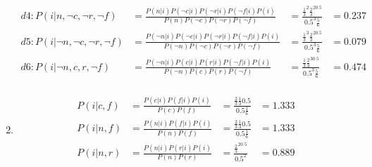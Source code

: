\documentclass{article}
\begin{document}
\begin{enumerate}
\begin{align*}
            d4: P(i|n,\lnot c,\lnot r,\lnot f) &=\frac{P(n|i)P(\lnot c|i)P(\lnot r|i)P(\lnot
        f|i)P(i)}{P(n)P(\lnot c)P(\lnot r)P(\lnot f)} &=
            \frac{\frac{1}{3}^2\frac{2}{3}^20.5}{0.5^3\frac{5}{6}} &= 0.237\\
            d5: P(i|\lnot n,\lnot c,\lnot r,\lnot f) &=\frac{P(\lnot n|i)P(\lnot c|i)P(\lnot r|i)P(\lnot
        f|i)P(i)}{P(\lnot n)P(\lnot c)P(\lnot r)P(\lnot f)} &=
            \frac{\frac{1}{3}^3\frac{2}{3}^20.5}{0.5^3\frac{5}{6}} &= 0.079\\
            d6: P(i|\lnot n,c,r,\lnot f) &=\frac{P(\lnot n|i)P(c|i)P(r|i)P(\lnot
        f|i)P(i)}{P(\lnot n)P(c)P(r)P(\lnot f)} &=
            \frac{\frac{1}{3}\frac{2}{3}^30.5}{0.5^3\frac{5}{6}} &= 0.474\\
        \end{align*}
    \item
        \begin{align*}
            P(i|c,f) &=\frac{P(c|i)P(f|i)P(i)}{P(c)P(f)} &=
            \frac{\frac{2}{3}\frac{1}{3}0.5}{0.5\frac{1}{6}} &= 1.333\\
            P(i|n,f) &=\frac{P(n|i)P(f|i)P(i)}{P(n)P(f)} &=
            \frac{\frac{2}{3}\frac{1}{3}0.5}{0.5\frac{1}{6}} &= 1.333\\
            P(i|n,r) &=\frac{P(n|i)P(r|i)P(i)}{P(n)P(r)} &=
            \frac{\frac{2}{3}^20.5}{0.5^2} &= 0.889\\
        \end{align*}
\end{enumerate}
\end{document}

